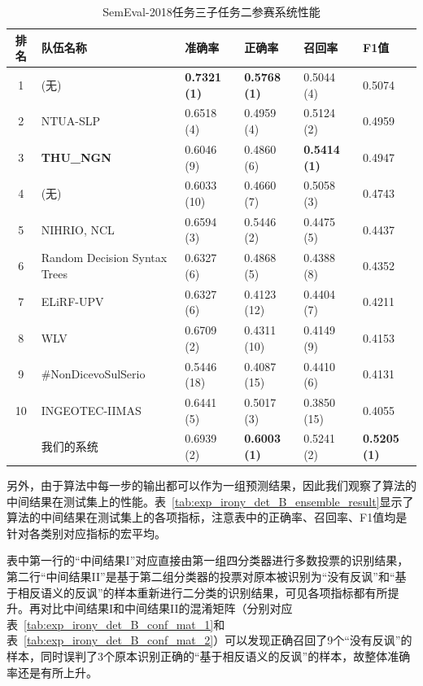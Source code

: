 \begin{table}[htb]
  \centering
  \begin{minipage}[t]{\linewidth}
  \caption{SemEval-2018任务三子任务二参赛系统性能} %
  \label{tab:exp_irony_det_B_other_comp}
    \begin{tabularx}{\linewidth}{c|X|llll}
    \toprule[1.5pt]
    排名 & 队伍名称 & 准确率 & 正确率 & 召回率 & F1值 \\
    \hline 
    1 & (无) & \bf 0.7321 (1) & \bf 0.5768 (1) & 0.5044 (4) & 0.5074 \\
    2 & NTUA-SLP & 0.6518 (4) & 0.4959 (4) & 0.5124 (2) & 0.4959 \\
    3 & \bf THU\_NGN & 0.6046 (9) & 0.4860 (6) & \bf 0.5414 (1) & 0.4947 \\
    4 & (无) & 0.6033 (10) & 0.4660 (7) & 0.5058 (3) & 0.4743 \\
    5 & NIHRIO, NCL & 0.6594 (3) & 0.5446 (2) & 0.4475 (5) & 0.4437 \\
    6 & Random Decision Syntax Trees & 0.6327 (6) & 0.4868 (5) & 0.4388 (8) & 0.4352 \\
    7 & ELiRF-UPV & 0.6327 (6) & 0.4123 (12) & 0.4404 (7) & 0.4211 \\
    8 & WLV & 0.6709 (2) & 0.4311 (10) & 0.4149 (9) & 0.4153 \\
    9 & \#NonDicevoSulSerio & 0.5446 (18) & 0.4087 (15) & 0.4410 (6) & 0.4131 \\
    10 & INGEOTEC-IIMAS & 0.6441 (5) & 0.5017 (3) & 0.3850 (15) & 0.4055 \\
    \hline
    & 我们的系统 & 0.6939 (2) & \bf 0.6003 (1) & 0.5241 (2) & \bf 0.5205 (1) \\
    \bottomrule[1.5pt]
    \end{tabularx}
  \end{minipage}
\end{table}

另外，由于算法中每一步的输出都可以作为一组预测结果，因此我们观察了算法的中间结果在测试集上的性能。表~\ref{tab:exp_irony_det_B_ensemble_result}显示了算法的中间结果在测试集上的各项指标，注意表中的正确率、召回率、F1值均是针对各类别对应指标的宏平均。

表中第一行的“中间结果I”对应直接由第一组四分类器进行多数投票的识别结果，第二行“中间结果II”是基于第二组分类器的投票对原本被识别为“没有反讽”和“基于相反语义的反讽”的样本重新进行二分类的识别结果，可见各项指标都有所提升。再对比中间结果I和中间结果II的混淆矩阵（分别对应表~\ref{tab:exp_irony_det_B_conf_mat_1}和表~\ref{tab:exp_irony_det_B_conf_mat_2}）可以发现正确召回了9个“没有反讽”的样本，同时误判了3个原本识别正确的“基于相反语义的反讽”的样本，故整体准确率还是有所上升。


